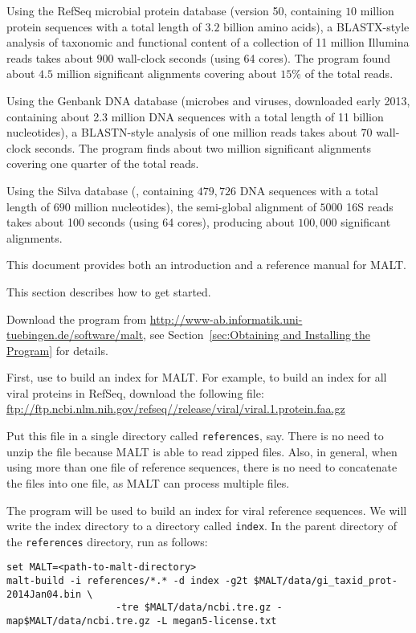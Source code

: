 \documentclass[11pt]{article}
\newcommand\MALT{{\sf MALT}\xspace}
\begin{document}
\begin{enumerate}
\item
Using the RefSeq microbial protein database (version 50, containing $10$ million protein sequences with a total length of $3.2$ billion amino acids), a BLASTX-style analysis of taxonomic and functional content of
a collection of 11 million Illumina reads takes about $900$ wall-clock seconds (using 64 cores).
The program found about $4.5$ million significant alignments covering about $15$\% of the total reads.
{
\item Using the Genbank DNA database (microbes and viruses,
downloaded early 2013, containing about 2.3 million DNA sequences with a total length of 
11 billion nucleotides), a BLASTN-style analysis of one million reads takes about $70$ wall-clock seconds. 
The program finds about two million  significant alignments covering one quarter of the total reads.
\item Using the Silva database (, containing $479,726$ DNA sequences with a total length of  $690$ million nucleotides), the semi-global alignment of $5000$ 16S reads takes about 100 seconds (using 64 cores), producing
about $100,000$ significant alignments. 
}
\end{enumerate}

This document provides both an introduction and a reference manual for \MALT.

\pagebreak

This section describes how to get started.

Download the program from \url{http://www-ab.informatik.uni-tuebingen.de/software/malt}, 
see Section~\ref{sec:Obtaining and Installing the Program}
for details.


First, use  to build an index for \MALT. For example,
to build an index for all viral proteins in RefSeq, download the following file:
\url{ftp://ftp.ncbi.nlm.nih.gov/refseq//release/viral/viral.1.protein.faa.gz}


Put this file in a single directory called {\tt references}, say. There is no need to unzip the file
because \MALT is able to read zipped files. Also, in general, when using more than one file of reference sequences,
there is no need to concatenate the files into one file, as \MALT can process multiple files.

The program  will be used to build an index for viral reference sequences. We will write the index
directory to a directory called {\tt index}.
In the parent directory of the {\tt references} directory, run  as follows:
{\footnotesize
\begin{verbatim}
set MALT=<path-to-malt-directory>
malt-build -i references/*.* -d index -g2t $MALT/data/gi_taxid_prot-2014Jan04.bin \
                   -tre $MALT/data/ncbi.tre.gz -map$MALT/data/ncbi.tre.gz -L megan5-license.txt
\end{verbatim}
}
\end{document}
